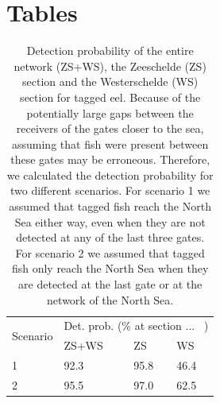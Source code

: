 \clearpage

\section{Tables}

\setcounter{table}{0} \renewcommand{\thetable}{C.\arabic{table}}
\setcounter{figure}{0} \renewcommand{\thefigure}{C.\arabic{figure}}

\begin{table}[h!]
\centering
\scriptsize
\caption{Detection probability of the entire network (ZS+WS), the Zeeschelde (ZS) section and the Westerschelde (WS) section for tagged eel. Because of the potentially large gaps between the receivers of the gates closer to the sea, assuming that fish were present between these gates may be erroneous. Therefore, we calculated the detection probability for two different scenarios. For scenario 1 we assumed that tagged fish reach the North Sea either way, even when they are not detected at any of the last three gates. For scenario 2 we assumed that tagged fish only reach the North Sea when they are detected at the last gate or at the network of the North Sea. \label{tab:det.prob.cases}}
\begin{tabular}{|l|l|l|l|} 
\hline
\multirow{2}{*}{Scenario} & \multicolumn{3}{l|}{Det. prob. (\% at section ...~ )}  \\ 
\cline{2-4}
                          & ZS+WS & ZS   & WS                                      \\ 
\hline
1                         & 92.3  & 95.8 & 46.4                                    \\ 
\hline
2                         & 95.5  & 97.0 & 62.5                                    \\
\hline
\end{tabular}
\end{table}

